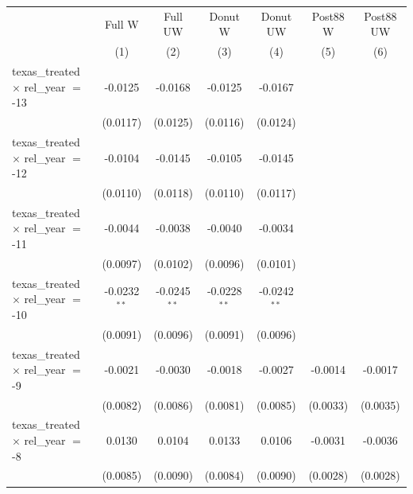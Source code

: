 
\begingroup
\centering
\begin{tabular}{lcccccc}
   \toprule
                                                & Full W         & Full UW        & Donut W        & Donut UW       & Post88 W        & Post88 UW \\   
                                                & (1)            & (2)            & (3)            & (4)            & (5)             & (6)\\  
   \midrule 
   texas\_treated $\times$ rel\_year $=$ -13    & -0.0125        & -0.0168        & -0.0125        & -0.0167        &                 &   \\   
                                                & (0.0117)       & (0.0125)       & (0.0116)       & (0.0124)       &                 &   \\   
   texas\_treated $\times$ rel\_year $=$ -12    & -0.0104        & -0.0145        & -0.0105        & -0.0145        &                 &   \\   
                                                & (0.0110)       & (0.0118)       & (0.0110)       & (0.0117)       &                 &   \\   
   texas\_treated $\times$ rel\_year $=$ -11    & -0.0044        & -0.0038        & -0.0040        & -0.0034        &                 &   \\   
                                                & (0.0097)       & (0.0102)       & (0.0096)       & (0.0101)       &                 &   \\   
   texas\_treated $\times$ rel\_year $=$ -10    & -0.0232$^{**}$ & -0.0245$^{**}$ & -0.0228$^{**}$ & -0.0242$^{**}$ &                 &   \\   
                                                & (0.0091)       & (0.0096)       & (0.0091)       & (0.0096)       &                 &   \\   
   texas\_treated $\times$ rel\_year $=$ -9     & -0.0021        & -0.0030        & -0.0018        & -0.0027        & -0.0014         & -0.0017\\   
                                                & (0.0082)       & (0.0086)       & (0.0081)       & (0.0085)       & (0.0033)        & (0.0035)\\   
   texas\_treated $\times$ rel\_year $=$ -8     & 0.0130         & 0.0104         & 0.0133         & 0.0106         & -0.0031         & -0.0036\\   
                                                & (0.0085)       & (0.0090)       & (0.0084)       & (0.0090)       & (0.0028)        & (0.0028)\\   

\end{tabular}
